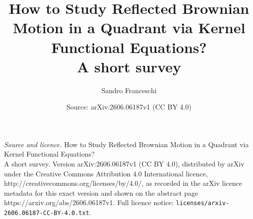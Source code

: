 \documentclass[10pt,a4paper]{amsart}
\title{How to Study Reflected Brownian Motion in a Quadrant via Kernel Functional Equations?\\ \medskip \large A short survey}
\author{Sandro Franceschi}
\date{Source: arXiv:2606.06187v1 (CC BY 4.0)}
\begin{document}
\maketitle

\noindent\emph{Source and licence.} How to Study Reflected Brownian Motion in a Quadrant via Kernel Functional Equations?\\ \medskip \large A short survey. Version arXiv:2606.06187v1 (CC BY 4.0), distributed by arXiv under the Creative Commons Attribution 4.0 International licence, http://creativecommons.org/licenses/by/4.0/, as recorded in the arXiv licence metadata for this exact version and shown on the abstract page https://arxiv.org/abs/2606.06187v1. Full licence notice: \texttt{licenses/arxiv-2606.06187-CC-BY-4.0.txt}.\par\smallskip
\end{document}
